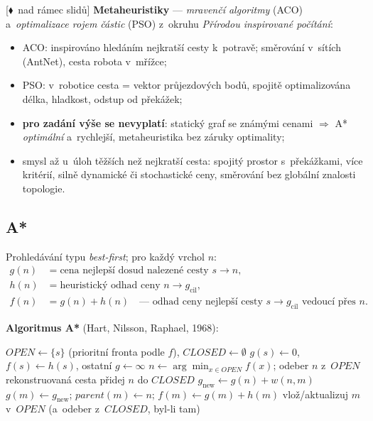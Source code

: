 \documentclass[11pt,a4paper]{article}
\theoremstyle{definition}
\newcommand{\mimo}{\textcolor{markcol}{\textsf{\footnotesize[$\blacklozenge$~nad rámec slidů]}}}
\begin{document}
\mimo{} \textbf{Metaheuristiky} --- \emph{mravenčí algoritmy} (ACO) a~\emph{optimalizace rojem
částic} (PSO) z~okruhu \emph{Přírodou inspirované počítání}:
\begin{itemize}
\item ACO: inspirováno hledáním nejkratší cesty k~potravě; směrování v~sítích (AntNet),
  cesta robota v~mřížce;
\item PSO: v~robotice cesta = vektor průjezdových bodů, spojitě optimalizována délka,
  hladkost, odstup od překážek;
\item \textbf{pro zadání výše se nevyplatí}: statický graf se známými cenami $\Rightarrow$ A*
  \emph{optimální} a~rychlejší, metaheuristika bez záruky optimality;
\item smysl až u~úloh těžších než nejkratší cesta: spojitý prostor s~překážkami, více kritérií,
  silně dynamické či stochastické ceny, směrování bez globální znalosti topologie.
\end{itemize}

\subsection{A*}

Prohledávání typu \emph{best-first}; pro každý vrchol $n$:
\begin{align*}
g(n) &= \text{cena nejlepší dosud nalezené cesty } s \to n, \\
h(n) &= \text{heuristický odhad ceny } n \to g_{\mathrm{cil}}, \\
f(n) &= g(n) + h(n) \quad \text{--- odhad ceny nejlepší cesty } s \to g_{\mathrm{cil}}
  \text{ vedoucí přes } n .
\end{align*}

\noindent\textbf{Algoritmus A*} (Hart, Nilsson, Raphael, 1968):
\begin{algorithmic}[1]
\State $\mathit{OPEN} \gets \{s\}$ (prioritní fronta podle $f$), $\mathit{CLOSED} \gets \emptyset$
\State $g(s) \gets 0$, $f(s) \gets h(s)$, ostatní $g \gets \infty$
  \State $n \gets \arg\min_{x \in \mathit{OPEN}} f(x)$; odeber $n$ z~$\mathit{OPEN}$
   \Return rekonstruovaná cesta \EndIf
  \State přidej $n$ do $\mathit{CLOSED}$
    \State $g_{\mathrm{new}} \gets g(n) + w(n,m)$
      \State $g(m) \gets g_{\mathrm{new}}$; $\mathit{parent}(m) \gets n$;
             $f(m) \gets g(m) + h(m)$
      \State vlož/aktualizuj $m$ v~$\mathit{OPEN}$ (a~odeber z~$\mathit{CLOSED}$, byl-li tam)
    \EndIf
  \EndFor
\EndWhile
\State \Return {}
\end{algorithmic}
\end{document}
